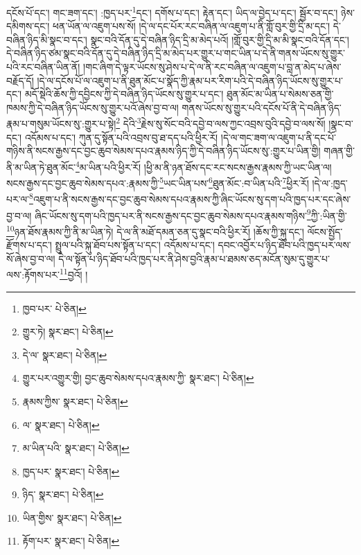 དངོས་པོ་དང་། གང་ཟག་དང་། :ཁྱད་པར་\footnote{ཁྱབ་པར་  པེ་ཅིན། }དང་། དགོས་པ་དང་། རྟེན་དང་། ཡིད་ལ་བྱེད་པ་དང་། སྦྱོར་བ་དང་། ཉེས་དམིགས་དང་། ཕན་ཡོན་ལ་འཇུག་པས་སོ། །དེ་ལ་དང་པོར་རང་བཞིན་ལ་འཇུག་པ་ནི་གློ་བུར་གྱི་དྲི་མ་དང་། དེ་བཞིན་ཉིད་མི་སྣང་བ་དང་། སྣང་བའི་དོན་དུ་དེ་བཞིན་ཉིད་དྲི་མ་མེད་པའོ། །གློ་བུར་གྱི་དྲི་མ་མི་སྣང་བའི་དོན་དང་། དེ་བཞིན་ཉིད་ཙམ་སྣང་བའི་དོན་དུ་དེ་བཞིན་ཉིད་དྲི་མ་མེད་པར་གྱུར་པ་གང་ཡིན་པ་དེ་ནི་གནས་ཡོངས་སུ་གྱུར་པའི་རང་བཞིན་ཡིན་ནོ། །གང་ཞིག་དེ་ལྟར་ཡོངས་སུ་ཤེས་པ་དེ་ལ་ནི་རང་བཞིན་ལ་འཇུག་པ་བླ་ན་མེད་པ་ཞེས་བརྗོད་དོ། །དེ་ལ་དངོས་པོ་ལ་འཇུག་པ་ནི་ཐུན་མོང་པ་སྣོད་ཀྱི་རྣམ་པར་རིག་པའི་དེ་བཞིན་ཉིད་ཡོངས་སུ་གྱུར་པ་དང་། མདོ་སྡེའི་ཆོས་ཀྱི་དབྱིངས་ཀྱི་དེ་བཞིན་ཉིད་ཡོངས་སུ་གྱུར་པ་དང་། ཐུན་མོང་མ་ཡིན་པ་སེམས་ཅན་གྱི་ཁམས་ཀྱི་དེ་བཞིན་ཉིད་ཡོངས་སུ་གྱུར་པའོ་ཞེས་བྱ་བ་ལ། གནས་ཡོངས་སུ་གྱུར་པའི་དངོས་པོ་ནི་དེ་བཞིན་ཉིད་རྣམ་པ་གསུམ་ཡོངས་སུ་:གྱུར་པ་སྟེ།\footnote{གྱུར་ཏེ།  སྣར་ཐང་།  པེ་ཅིན། } དེའི་\footnote{དེ་ལ་  སྣར་ཐང་།  པེ་ཅིན། }རྗེས་སུ་སོང་བའི་དབྱེ་བ་ལས་ཀྱང་འབྲས་བུའི་དབྱེ་བ་ལས་སོ། །སྣང་བ་དང་། འདོམས་པ་དང་། ཀུན་དུ་སྟོན་པའི་འབྲས་བུ་ཐ་དད་པའི་ཕྱིར་རོ། །དེ་ལ་གང་ཟག་ལ་འཇུག་པ་ནི་དང་པོ་གཉིས་ནི་སངས་རྒྱས་དང་བྱང་ཆུབ་སེམས་དཔའ་རྣམས་ཉིད་ཀྱི་དེ་བཞིན་ཉིད་ཡོངས་སུ་:གྱུར་པ་ཡིན་གྱི། གཞན་གྱི་ནི་མ་ཡིན་ཏེ་ཐུན་མོང་\footnote{གྱུར་པར་འགྱུར་གྱི། བྱང་ཆུབ་སེམས་དཔའ་རྣམས་ཀྱི་  སྣར་ཐང་།  པེ་ཅིན། }མ་ཡིན་པའི་ཕྱིར་རོ། །ཕྱི་མ་ནི་ཉན་ཐོས་དང་རང་སངས་རྒྱས་རྣམས་ཀྱི་ཡང་ཡིན་ལ། སངས་རྒྱས་དང་བྱང་ཆུབ་སེམས་དཔའ་:རྣམས་ཀྱི་\footnote{རྣམས་ཀྱིས་  སྣར་ཐང་།  པེ་ཅིན། }ཡང་ཡིན་པས་\footnote{ལ་  སྣར་ཐང་།  པེ་ཅིན། }ཐུན་མོང་:བ་ཡིན་པའི་\footnote{མ་ཡིན་པའི་  སྣར་ཐང་།  པེ་ཅིན། }ཕྱིར་རོ། །དེ་ལ་:ཁྱད་པར་ལ་\footnote{ཁྱད་པར་  སྣར་ཐང་།  པེ་ཅིན། }འཇུག་པ་ནི་སངས་རྒྱས་དང་བྱང་ཆུབ་སེམས་དཔའ་རྣམས་ཀྱི་ཞིང་ཡོངས་སུ་དག་པའི་ཁྱད་པར་དང་ཞེས་བྱ་བ་ལ། ཞིང་ཡོངས་སུ་དག་པའི་ཁྱད་པར་ནི་སངས་རྒྱས་དང་བྱང་ཆུབ་སེམས་དཔའ་རྣམས་གཉིས་\footnote{ཉིད་  སྣར་ཐང་།  པེ་ཅིན། }ཀྱི་:ཡིན་གྱི་\footnote{ཡིན་གྱིས་  སྣར་ཐང་།  པེ་ཅིན། }ཉན་ཐོས་རྣམས་ཀྱི་ནི་མ་ཡིན་ཏེ། དེ་ལ་ནི་མཐོ་དམན་ཅན་དུ་སྣང་བའི་ཕྱིར་རོ། །ཆོས་ཀྱི་སྐུ་དང་། ལོངས་སྤྱོད་རྫོགས་པ་དང་། སྤྲུལ་པའི་སྐུ་ཐོབ་པས་སྟོན་པ་དང་། འདོམས་པ་དང་། དབང་འབྱོར་པ་ཉིད་ཐོབ་པའི་ཁྱད་པར་ལས་སོ་ཞེས་བྱ་བ་ལ། དེ་ལ་སྟོན་པ་ཉིད་ཐོབ་པའི་ཁྱད་པར་ནི་ཤེས་བྱའི་རྣམ་པ་ཐམས་ཅད་མངོན་སུམ་དུ་གྱུར་པ་ལས་:རྟོགས་པར་\footnote{རྟོག་པར་  སྣར་ཐང་།  པེ་ཅིན། }བྱའོ། །
